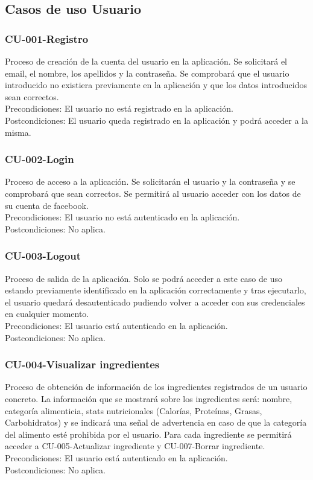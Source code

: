 \documentclass[12pt, a4paper, twoside]{book}
\begin{document}
	\subsection{Casos de uso Usuario}
	\subsubsection{CU-001-Registro}
	Proceso de creación de la cuenta del usuario en la aplicación. Se solicitará el email, el nombre, los apellidos y la contraseña.
	Se comprobará que el usuario introducido no existiera previamente en la aplicación y que los datos introducidos sean correctos.\\
	Precondiciones: El usuario no está registrado en la aplicación.\\
	Postcondiciones: El usuario queda registrado en la aplicación y podrá acceder a la misma.
	\subsubsection{CU-002-Login}
	Proceso de acceso a la aplicación. Se solicitarán el usuario y la contraseña y se comprobará que sean correctos. Se permitirá al usuario acceder con los datos de su cuenta de facebook.\\ 	
	Precondiciones: El usuario no está autenticado en la aplicación.\\
	Postcondiciones: No aplica.
	\subsubsection{CU-003-Logout}
	Proceso de salida de la aplicación. Solo se podrá acceder a este caso de uso estando previamente identificado en la aplicación correctamente y tras ejecutarlo, el usuario quedará desautenticado pudiendo volver a acceder con sus credenciales en cualquier momento.\\
	Precondiciones: El usuario está autenticado en la aplicación.\\
	Postcondiciones: No aplica.
	\subsubsection{CU-004-Visualizar ingredientes}
	Proceso de obtención de información de los ingredientes registrados de un usuario concreto. La información que se mostrará sobre los ingredientes será: nombre, categoría alimenticia, stats nutricionales (Calorías, Proteínas, Grasas, Carbohidratos) y se indicará una señal de advertencia en caso de que la categoría del alimento esté prohibida por el usuario.
	Para cada ingrediente se permitirá acceder a CU-005-Actualizar ingrediente y CU-007-Borrar ingrediente.\\
	Precondiciones: El usuario está autenticado en la aplicación.\\
	Postcondiciones: No aplica.
\end{document}
